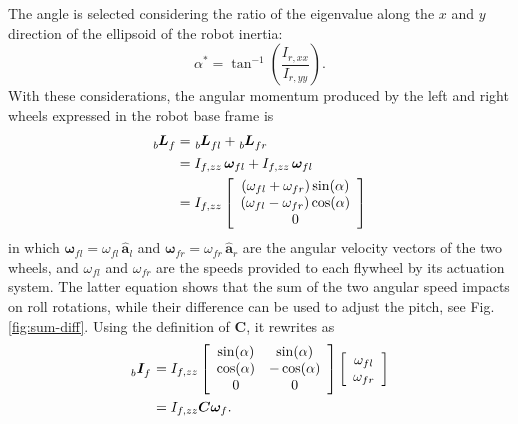 \documentclass[letterpaper, 10 pt, conference]{ieeeconf}  %
\begin{document}
The angle is selected considering the ratio of the eigenvalue along the $x$ and $y$ direction of the ellipsoid of the robot inertia:
\begin{equation*}
\alpha^{*}=\tan^{-1}\left(\dfrac{I_{r, xx}}{I_{r, yy}}\right).
\end{equation*}
With these considerations, the angular momentum produced by the left and right wheels expressed in the robot base frame is
\begin{equation}
\begin{split}
\tensor[_b]{\bm{L}}{_f} &= \tensor[_b]{\bm{L}}{_{fl}} + \tensor[_b]{\bm{L}}{_{fr}} \\
&=I_{f, zz} \, \bm{\omega}_{fl} + I_{f, zz} \, \bm{\omega}_{fl}\\
&=I_{f, zz}
\left[\begin{array}{c}
 \left(\omega_{fl} +  \omega_{fr}\right)\sin(\alpha) \\ 
 \left(\omega_{fl} -  \omega_{fr}\right)\cos(\alpha) \\
 0
\end{array}\right]
\end{split}
\end{equation}
in which $\bm{\omega}_{fl}= \omega_{fl} \, \hat{\bm{a}}_{l}$ and $\bm{\omega}_{fr}= \omega_{fr} \, \hat{\bm{a}}_{r}$ are the angular velocity vectors of the two wheels, and $\omega_{fl}$ and $\omega_{fr}$ are the speeds provided to each flywheel by its actuation system. The latter equation shows that the sum of the two angular speed impacts on roll rotations, while their difference can be used to adjust the pitch, see Fig. \ref{fig:sum-diff}. Using the definition of $\bm{C}$, it rewrites as
\begin{equation}
\begin{split}
\tensor[_b]{\bm{I}}{_f} & = I_{f,zz}
\left[
\begin{array}{cc}
\sin(\alpha) & \sin(\alpha) \\
\cos(\alpha) & -\cos(\alpha) \\
0 & 0
\end{array}
\right]
\left[
\begin{array}{cc}
\omega_{fl} \\
\omega_{fr}
\end{array}
\right] \\
&= I_{f,zz} \bm{C} \bm{\omega}_f.
\end{split}
\end{equation}
\end{document}
